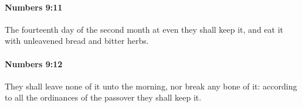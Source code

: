 		\paragraph{Numbers 9:11} %
			\label{NUMBERS-9-11}

			The fourteenth day of the second month at even they shall keep it, and eat it with unleavened bread and bitter herbs.


		\paragraph{Numbers 9:12} %
			\label{NUMBERS-9-12}

			They shall leave none of it unto the morning, nor break any bone of it: according to all the ordinances of the passover they shall keep it.


